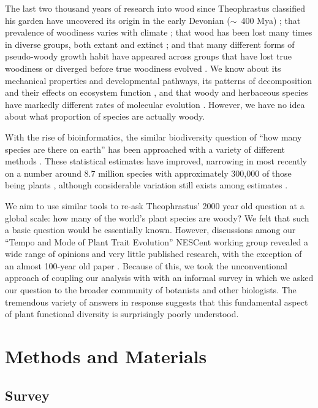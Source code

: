 \documentclass[a4paper,12pt]{article}
\begin{document}
The last two thousand years of research into wood since Theophrastus
classified his garden have uncovered its origin in the early Devonian
($\sim$~400 Mya) \citep{gerrienne2011simple}; that prevalence of
woodiness varies with climate \citep{Molesheihgt}; that wood has been
lost many times in diverse groups, both extant and extinct
\citep{judd1994}; and that many different forms of pseudo-woody growth
habit have appeared across groups that have lost true woodiness or
diverged before true woodiness evolved \citep{Cornwellwood}.  We know
about its mechanical properties and developmental pathways, its
patterns of decomposition and their effects on ecosystem function
\citep{Cornwellwood}, and that woody and herbaceous species have
markedly different rates of molecular evolution \citep{SmithDonoghue}.
%
However, we have no idea about what proportion of species are actually
woody.

With the rise of bioinformatics, the similar biodiversity question of
``how many species are there on earth'' has been approached with a
variety of different methods \citep{may1988many,erwin1991many,
  stork1993many, joppa2010, costello2011, mora2011plos}.  These
statistical estimates have improved, narrowing in most recently on a
number around 8.7 million species with approximately 300,000 of those
being plants \citep{mora2011plos}, although considerable variation
still exists among estimates \citep{costello2011}.

We aim to use similar tools to re-ask Theophrastus' 2000 year old
question at a global scale: how many of the world's plant species are
woody?
%
We felt that such a basic question would be essentially known.
%
However, discussions among our ``Tempo and Mode of Plant Trait
Evolution'' NESCent working group revealed a wide range of opinions
and very little published research, with the exception of an almost
100-year old paper \citep{sinnott1915evolution}.
%
Because of this, we took the unconventional approach of coupling our
analysis with with an informal survey in which we asked our question
to the broader community of botanists and other biologists.
% 
The tremendous variety of answers in response suggests that this
fundamental aspect of plant functional diversity is surprisingly
poorly understood.

\section{Methods and Materials}

\subsection{Survey}
\end{document}

